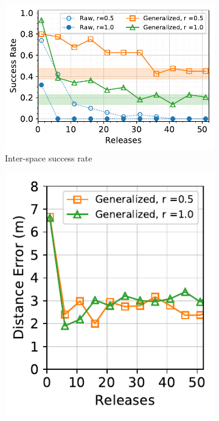 \begin{figure}[t]
	\centering
	\begin{subfigure}{0.61\columnwidth}
		\includegraphics[width=\columnwidth]{figures/cdng-successive-interspace.pdf}
		\vspace{-5mm}
		\caption{\small Inter-space success rate\newline }
		\label{fig:partial-interspace}
	\end{subfigure}
	\begin{subfigure}{0.37\columnwidth}
		\includegraphics[width=\columnwidth]{figures/cdng-successive-intraspace.pdf}

\end{subfigure}
\end{figure}
